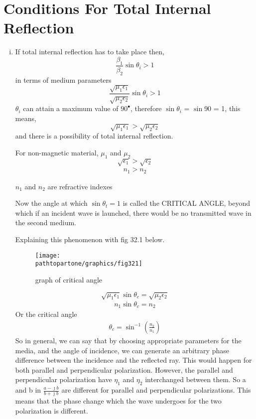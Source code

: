 \section{Conditions For Total Internal Reflection}
\begin{enumerate}[(i)]
\item If total internal reflection has to take place then,
\begin{equation*}
\frac{\beta_1}{\beta_2}\sin\theta_i > 1
\end{equation*}
in terms of medium parameters
\begin{equation*}
\frac{\sqrt{\mu_1\epsilon_1}}{\sqrt{\mu_2\epsilon_2}}\sin\theta_i > 1
\end{equation*}
$\theta_i$ can attain a maximum value of $90^\bullet$, therefore $\sin\theta_i$ = $\sin$90 = 1, this means,
\begin{equation}
\sqrt{\mu_1\epsilon_1} > \sqrt{\mu_2\epsilon_2}
\end{equation}
and there is a possibility of total internal reflection.

For non-magnetic material, $\mu_1$ and $\mu_2$
\begin{equation*}
\sqrt{\epsilon_1} > \sqrt{\epsilon_2}
\end{equation*}
\begin{align*}
n_1 > n_2
\end{align*} \begin{center}
$n_1$ and $n_2$ are refractive indexes
\end{center} 
Now the angle at which $\sin\theta_t = 1$ is called the CRITICAL ANGLE, beyond which if an incident wave is launched, there would be no transmitted wave in the second medium.

Explaining this phenomenon with fig 32.1 below.
\begin{figure}[h]
\centering
\texttt{[image: \\pathtopartone/graphics/fig321]}
\caption{graph of critical angle}
\end{figure}

\begin{equation*}
\sqrt{\mu_1\epsilon_1} \sin\theta_c = \sqrt{\mu_2\epsilon_2}
\end{equation*}
\begin{align*}
n_1 \sin\theta_c = n_2
\end{align*}
Or the critical angle
\begin{align*}
\theta_c = \sin^{-1}(\frac{n_2}{n_1}) 
\end{align*}
So in general, we can say that by choosing appropriate parameters for the media, and the angle of incidence, we can generate an arbitrary phase difference between the incidence and the reflected ray. This would happen for both parallel and perpendicular polarization. However, the parallel and perpendicular polarization have $\eta_1$ and $\eta_2$
interchanged between them. So a and b in $\frac{a - \jmath b}{b + \jmath b}$ are different for parallel and perpendicular polarizations. This means that the phase change which the wave undergoes for the two polarization is different.


\end{enumerate}
